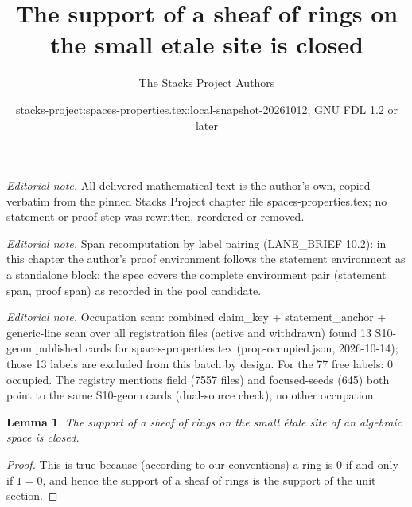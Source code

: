 \documentclass[10pt,a4paper]{amsart}
\title{The support of a sheaf of rings on the small etale site is closed}
\author{The Stacks Project Authors}
\date{stacks-project:spaces-properties.tex:local-snapshot-20261012; GNU FDL 1.2 or later}
\theoremstyle{plain}
\newtheorem{lemma}[subsection]{Lemma}
\theoremstyle{definition}
\theoremstyle{remark}
\numberwithin{equation}{subsection}
\begin{document}
\maketitle
\noindent\textit{Editorial note.} All delivered mathematical text is the author's own, copied verbatim from the pinned Stacks Project chapter file spaces-properties.tex; no statement or proof step was rewritten, reordered or removed.\par\medskip
\noindent\textit{Editorial note.} Span recomputation by label pairing (LANE\_BRIEF 10.2): in this chapter the author's proof environment follows the statement environment as a standalone block; the spec covers the complete environment pair (statement span, proof span) as recorded in the pool candidate.\par\medskip
\noindent\textit{Editorial note.} Occupation scan: combined claim\_key + statement\_anchor + generic-line scan over all registration files (active and withdrawn) found 13 S10-geom published cards for spaces-properties.tex (prop-occupied.json, 2026-10-14); those 13 labels are excluded from this batch by design. For the 77 free labels: 0 occupied. The registry mentions field (7557 files) and focused-seeds (645) both point to the same S10-geom cards (dual-source check), no other occupation.\par\medskip
\begin{lemma}
\label{lemma-support-sheaf-rings-closed}
The support of a sheaf of rings on the small \'etale site of an
algebraic space is closed.
\end{lemma}

\begin{proof}
This is true because (according to our conventions)
a ring is $0$ if and only if
$1 = 0$, and hence the support of a sheaf of rings
is the support of the unit section.
\end{proof}
\end{document}
